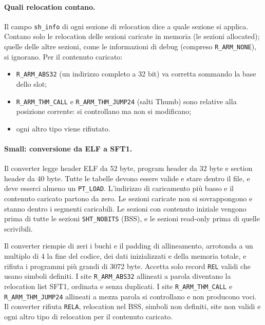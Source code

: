 \paragraph{Quali relocation contano.} Il campo \texttt{sh\_info} di ogni sezione di relocation dice a quale sezione si applica. Contano solo le relocation delle sezioni caricate in memoria (le sezioni allocated); quelle delle altre sezioni, come le informazioni di debug (compreso \texttt{R\_ARM\_NONE}), si ignorano. Per il contenuto caricato:
\begin{itemize}
\item \texttt{R\_ARM\_ABS32} (un indirizzo completo a 32 bit) va corretta sommando la base dello slot;
\item \texttt{R\_ARM\_THM\_CALL} e \texttt{R\_ARM\_THM\_JUMP24} (salti Thumb) sono relative alla posizione corrente: si controllano ma non si modificano;
\item ogni altro tipo viene rifiutato.
\end{itemize}

\paragraph{Small: conversione da ELF a SFT1.} Il converter legge header ELF da 52 byte, program header da 32 byte e section header da 40 byte. Tutte le tabelle devono essere valide e stare dentro il file, e deve esserci almeno un \texttt{PT\_LOAD}. L'indirizzo di caricamento più basso e il contenuto caricato partono da zero. Le sezioni caricate non si sovrappongono e stanno dentro i segmenti caricabili. Le sezioni con contenuto iniziale vengono prima di tutte le sezioni \texttt{SHT\_NOBITS} (BSS), e le sezioni read-only prima di quelle scrivibili.

Il converter riempie di zeri i buchi e il padding di allineamento, arrotonda a un multiplo di 4 la fine del codice, dei dati inizializzati e della memoria totale, e rifiuta i programmi più grandi di 3072 byte. Accetta solo record \texttt{REL} validi che usano simboli definiti. I site \texttt{R\_ARM\_ABS32} allineati a parola diventano la relocation list SFT1, ordinata e senza duplicati. I site \texttt{R\_ARM\_THM\_CALL} e \texttt{R\_ARM\_THM\_JUMP24} allineati a mezza parola si controllano e non producono voci. Il converter rifiuta \texttt{RELA}, relocation nel BSS, simboli non definiti, site non validi e ogni altro tipo di relocation per il contenuto caricato.

